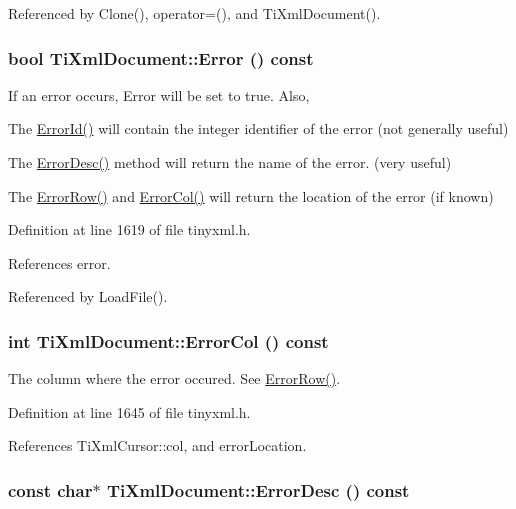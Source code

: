 Referenced by Clone(), operator=(), and TiXmlDocument().\hypertarget{class_ti_xml_document_a6dfc01a6e5d58e56acd537dfd3bdeb29}{
\subsubsection[{Error}]{\setlength{\rightskip}{0pt plus 5cm}bool TiXmlDocument::Error () const}}
\label{class_ti_xml_document_a6dfc01a6e5d58e56acd537dfd3bdeb29}
If an error occurs, Error will be set to true. Also,
\begin{DoxyItemize}
\item The \hyperlink{class_ti_xml_document_af96fc2f3f9ec6422782bfe916c9e778f}{ErrorId()} will contain the integer identifier of the error (not generally useful)
\item The \hyperlink{class_ti_xml_document_a9d0f689f6e09ea494ea547be8d79c25e}{ErrorDesc()} method will return the name of the error. (very useful)
\item The \hyperlink{class_ti_xml_document_af30efc75e804aa2e92fb8be3a8cb676e}{ErrorRow()} and \hyperlink{class_ti_xml_document_aa90bc630ee5203c6109ca5fad3323649}{ErrorCol()} will return the location of the error (if known) 
\end{DoxyItemize}

Definition at line 1619 of file tinyxml.h.

References error.

Referenced by LoadFile().\hypertarget{class_ti_xml_document_aa90bc630ee5203c6109ca5fad3323649}{
\subsubsection[{ErrorCol}]{\setlength{\rightskip}{0pt plus 5cm}int TiXmlDocument::ErrorCol () const}}
\label{class_ti_xml_document_aa90bc630ee5203c6109ca5fad3323649}


The column where the error occured. See \hyperlink{class_ti_xml_document_af30efc75e804aa2e92fb8be3a8cb676e}{ErrorRow()}. 

Definition at line 1645 of file tinyxml.h.

References TiXmlCursor::col, and errorLocation.\hypertarget{class_ti_xml_document_a9d0f689f6e09ea494ea547be8d79c25e}{
\subsubsection[{ErrorDesc}]{\setlength{\rightskip}{0pt plus 5cm}const char$\ast$ TiXmlDocument::ErrorDesc () const}}
\label{class_ti_xml_document_a9d0f689f6e09ea494ea547be8d79c25e}


